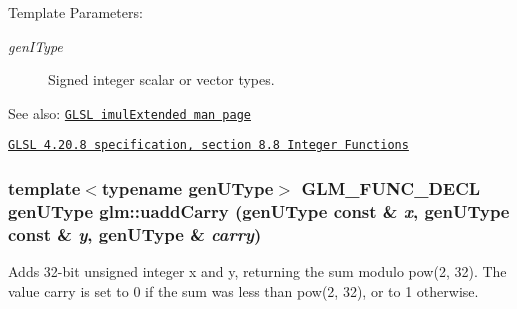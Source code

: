 \begin{Desc}
\item[Template Parameters:]
\begin{description}
\item[{\em genIType}]Signed integer scalar or vector types.\end{description}
\end{Desc}
\begin{Desc}
\item[See also:]\href{http://www.opengl.org/sdk/docs/manglsl/xhtml/imulExtended.xml}{\tt GLSL imulExtended man page} 

\href{http://www.opengl.org/registry/doc/GLSLangSpec.4.20.8.pdf}{\tt GLSL 4.20.8 specification, section 8.8 Integer Functions} \end{Desc}
\hypertarget{group__core__func__integer_gcb5031847f80c2e28151a687e57bd4b8}{
\subsubsection[uaddCarry]{\setlength{\rightskip}{0pt plus 5cm}template$<$typename genUType$>$ GLM\_\-FUNC\_\-DECL genUType glm::uaddCarry (genUType const \& {\em x}, \/  genUType const \& {\em y}, \/  genUType \& {\em carry})}}
\label{group__core__func__integer_gcb5031847f80c2e28151a687e57bd4b8}


Adds 32-bit unsigned integer x and y, returning the sum modulo pow(2, 32). The value carry is set to 0 if the sum was less than pow(2, 32), or to 1 otherwise.

